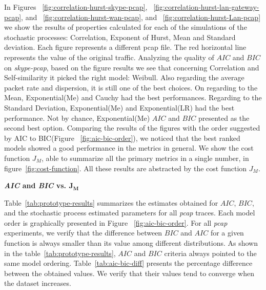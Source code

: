 In Figures ~\ref{fig:correlation-hurst-skype-pcap}, ~\ref{fig:correlation-hurst-lan-gateway-pcap}, and ~\ref{fig:correlation-hurst-wan-pcap}, and  ~\ref{fig:correlation-hurst-Lan-pcap} we show the results of properties calculated for each of the simulations of the stochastic processes: Correlation, Exponent of Hurst, Mean and Standard deviation. Each figure represents a different pcap file. The red horizontal line represents the value of the original traffic. Analyzing the quality of $AIC$ and $BIC$ on \textit{skype-pcap}, based on the figure results we see that concerning Correlation and Self-similarity it picked the right model: Weibull. Also regarding the average packet rate and dispersion, it is still one of the best choices. On regarding to the Mean, Exponential(Me) and Cauchy had the best performances. Regarding to the Standard Deviation, Exponential(Me) and Exponential(LR) had the best performance. Not by chance, Exponential(Me) $AIC$ and $BIC$ presented as the second best option. Comparing the results of the figures with the order suggested by AIC to BIC(Figure ~\ref{fig:aic-bic-order}), we noticed that the best ranked models showed a good performance in the metrics in general. We show the cost function $J_M$, able to summarize all the primary metrics in a single number, in figure~\ref{fig:cost-function}. All these results are abstracted by the cost function $J_M$. 


\smallskip \noindent  \textbf{\textit{AIC} and \textit{BIC} vs. $\boldsymbol{J_M}$ } 

Table~\ref{tab:prototype-results} summarizes the estimates obtained  for $AIC$, $BIC$, and the stochastic process estimated parameters for all \textit{pcap} traces. Each model order is graphically presented in Figure ~\ref{fig:aic-bic-order}.  For all \textit{pcap} experiments, we verify that the difference between $BIC$ and $AIC$ for a given function is always smaller than its value among different distributions. As shown in the table~\ref{tab:prototype-results}, $AIC$ and $BIC$ criteria always pointed to the same model ordering. Table~\ref{tab:aic-bic-diff} presents the percentage difference between the obtained values. We verify that their values tend to converge when the dataset increases. 

